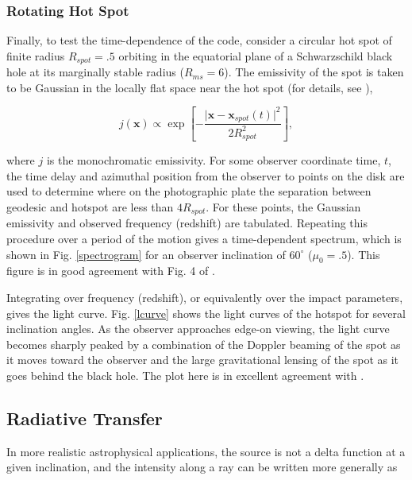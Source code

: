 \documentclass[apj]{emulateapj}
\begin{document}
\subsubsection{Rotating Hot Spot}

Finally, to test the time-dependence of the code, consider a circular hot spot of finite radius $R_{spot}=.5$ orbiting in the equatorial plane of a Schwarzschild black hole at its marginally stable radius ($R_{ms}=6$). The emissivity of the spot is taken to be Gaussian in the locally flat space near the hot spot (for details, see \citealt{schnittmanphd}),

\begin{equation}
 j(\mathbf{x}) \propto \exp{\left [-\frac{\vert \mathbf{x}-\mathbf{x}_{spot}(t) \vert^2}{2 R_{spot}^2} \right]},
\end{equation}

\noindent where $j$ is the monochromatic emissivity. For some observer coordinate time, $t$, the time delay and azimuthal position from the observer to points on the disk are used to determine where on the photographic plate the separation between geodesic and hotspot are less than $4 R_{spot}$. For these points, the Gaussian emissivity and observed frequency (redshift) are tabulated. Repeating this procedure over a period of the motion gives a time-dependent spectrum, which is shown in Fig. \ref{spectrogram} for an observer inclination of $60^{\circ}$ ($\mu_0=.5$). This figure is in good agreement with Fig. 4 of \citet{schnittmanbertschinger2004}.

Integrating over frequency (redshift), or equivalently over the impact parameters, gives the light curve. Fig. \ref{lcurve} shows the light curves of the hotspot for several inclination angles. As the observer approaches edge-on viewing, the light curve becomes sharply peaked by a combination of the Doppler beaming of the spot as it moves toward the observer and the large gravitational lensing of the spot as it goes behind the black hole. The plot here is in excellent agreement with \citet{schnittmanbertschinger2004}.

\subsection{Radiative Transfer}

In more realistic astrophysical applications, the source is not a delta function at a given inclination, and the intensity along a ray can be written more generally as
\end{document}
